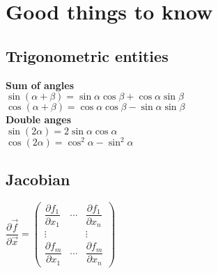 \section{Good things to know}
\subsection*{Trigonometric entities}
\textbf{Sum of angles}\\
$\sin(\alpha + \beta) = \sin \alpha \cos \beta + \cos \alpha \sin
\beta$\\
$\cos(\alpha + \beta) = \cos \alpha \cos \beta - \sin \alpha \sin
\beta$\\
\textbf{Double anges}\\
$\sin(2 \alpha) = 2 \sin \alpha \cos \alpha$\\
$\cos(2 \alpha) = \cos^2 \alpha - \sin^2 \alpha$

\subsection*{Jacobian}
$ \dfrac{\partial \vec{f}}{\partial{\vec{x}}}
=
\begin{pmatrix}
  \dfrac{\partial {f_1}}{\partial{x_1}} &
  \cdots &
  \dfrac{\partial {f_1}}{\partial{x_n}}\\
  \vdots & & \vdots \\
  \dfrac{\partial {f_m}}{\partial{x_1}} &
  \cdots &
  \dfrac{\partial {f_m}}{\partial{x_n}}
\end{pmatrix}
$\\
